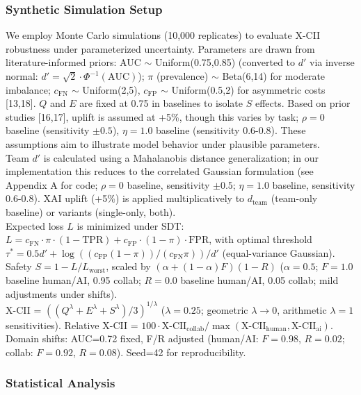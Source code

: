 \documentclass[a4paper]{article}
\begin{document}
\subsubsection{Synthetic Simulation
Setup}\label{synthetic-simulation-setup}

We employ Monte Carlo simulations (10,000 replicates) to evaluate X-CII
robustness under parameterized uncertainty. Parameters are drawn from
literature-informed priors: AUC $\sim$ Uniform(0.75,0.85)
(converted to $d'$ via inverse normal: $d' = \sqrt{2} \cdot \Phi^{-1}(\text{AUC})$); $\pi$ (prevalence)
$\sim$ Beta(6,14) for moderate imbalance; $c_{\text{FN}}$
$\sim$ Uniform(2,5), $c_{\text{FP}}$ $\sim$ Uniform(0.5,2)
for asymmetric costs {[}13,18{]}. $Q$ and $E$ are fixed at 0.75 in baselines
to isolate $S$ effects. Based on prior studies {[}16,17{]}, uplift is
assumed at +5\%, though this varies by task; $\rho=0$ baseline (sensitivity
$\pm0.5$), $\eta=1.0$ baseline (sensitivity 0.6-0.8). These assumptions aim to
illustrate model behavior under plausible parameters.\\
Team $d'$ is calculated using a Mahalanobis distance generalization; in
our implementation this reduces to the correlated Gaussian formulation
(see Appendix A for code; $\rho=0$ baseline, sensitivity $\pm0.5$; $\eta=1.0$
baseline, sensitivity 0.6-0.8). XAI uplift (+5\%) is applied
multiplicatively to $d_{\text{team}}$ (team-only baseline) or variants
(single-only, both).\\
Expected loss $L$ is minimized under SDT: $L = c_{\text{FN}} \cdot \pi \cdot (1 - \text{TPR}) + c_{\text{FP}} \cdot (1 - \pi) \cdot \text{FPR}$, with
optimal threshold $\tau^* = 0.5 d' + \log((c_{\text{FP}}(1-\pi))/(c_{\text{FN}} \pi)) / d'$
(equal-variance Gaussian). Safety $S = 1 - L / L_{\text{worst}}$, scaled by $(\alpha +
(1-\alpha)F)(1-R)$ ($\alpha=0.5$; $F=1.0$ baseline human/AI, 0.95 collab; $R=0.0$
baseline human/AI, 0.05 collab; mild adjustments under shifts).\\
X-CII = $((Q^{\lambda} + E^{\lambda} + S^{\lambda})/3)^{1/\lambda}$ ($\lambda=0.25$; geometric
$\lambda\to0$, arithmetic $\lambda=1$ sensitivities). Relative X-CII = $100 \cdot \text{X-CII}_{\text{collab}}
/ \max(\text{X-CII}_{\text{human}}, \text{X-CII}_{\text{ai}})$. Domain shifts: AUC=0.72 fixed, F/R
adjusted (human/AI: $F=0.98$, $R=0.02$; collab: $F=0.92$, $R=0.08$). Seed=42 for
reproducibility.

\subsubsection{Statistical Analysis}\label{statistical-analysis}
\end{document}
